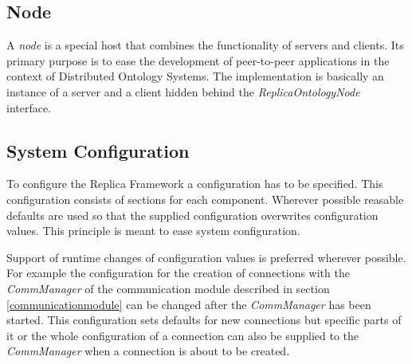 \subsection{Node}
A \emph{node} is a special host that combines the functionality of
servers and clients. Its primary purpose is to ease the development of
peer-to-peer applications in the context of Distributed Ontology Systems.
The implementation is basically an instance of a server and a client
hidden behind the \emph{ReplicaOntologyNode} interface.


\subsection{System Configuration}
To configure the Replica Framework a configuration has to be specified.
This configuration consists of sections for each component. Wherever
possible reasable defaults are used so that the supplied configuration
overwrites configuration values. This principle is meant to ease system
configuration.

Support of runtime changes of configuration values is preferred wherever
possible. For example the configuration for the creation of connections
with the \emph{CommManager} of the communication module described in section
\ref{communicationmodule} can be changed after the \emph{CommManager}
has been started. This configuration sets defaults for
new connections but specific parts of it or the whole configuration of
a connection can also be supplied to the \emph{CommManager} when a connection
is about to be created.


